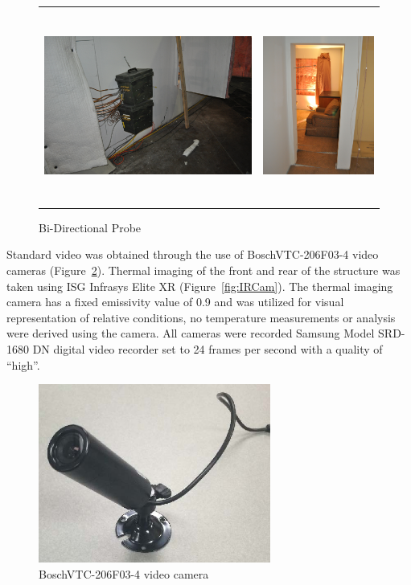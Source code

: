 \documentclass[12pt,oneside]{book}
\begin{document}
\begin{figure}[H]
	\centering
	\begin{tabular}{c c}
		\includegraphics[height = 2.5in]{0_Images/Instrumentation/PressureBox.jpg} &
		\includegraphics[height = 2.5in]{0_Images/Instrumentation/BDPArray.jpg} \\
	\end{tabular}
	\caption{Bi-Directional Probe}
	\label{fig:BDP}
\end{figure}

Standard video was obtained through the use of BoschVTC-206F03-4 video cameras (Figure~\ref{fig:BullettCam}). Thermal imaging of the front and rear of the structure was taken using ISG Infrasys Elite XR (Figure~\ref{fig:IRCam}). The thermal imaging camera has a fixed emissivity value of 0.9 and was utilized for visual representation of relative conditions, no temperature measurements or analysis were derived using the camera. All cameras were recorded Samsung Model SRD-1680 DN digital video recorder set to 24 frames per second with a quality of ``high''.

\begin{figure}[H]
	\centering
	\includegraphics[width = 3in]{0_Images/Instrumentation/BullettCam.jpg}

	\caption{BoschVTC-206F03-4 video camera}
	\label{fig:BullettCam}
\end{figure}
\end{document}
